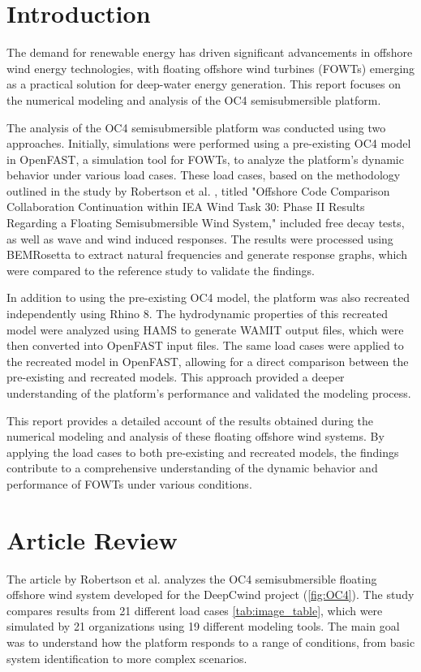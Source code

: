 \documentclass[a4paper, 11pt]{article}
\begin{document}
\section{Introduction}

\hspace*{0.5cm}The demand for renewable energy has driven significant advancements in offshore wind energy technologies, with floating offshore wind turbines (FOWTs) emerging as a practical solution for deep-water energy generation. This report focuses on the numerical modeling and analysis of the OC4 semisubmersible platform. 

The analysis of the OC4 semisubmersible platform was conducted using two approaches. Initially, simulations were performed using a pre-existing OC4 model in OpenFAST, a simulation tool for FOWTs, to analyze the platform's dynamic behavior under various load cases. These load cases, based on the methodology outlined in the study by Robertson et al. \cite{Robertson2014}, titled "Offshore Code Comparison Collaboration Continuation within IEA Wind Task 30: Phase II Results Regarding a Floating Semisubmersible Wind System," included free decay tests, as well as wave and wind induced responses. The results were processed using BEMRosetta to extract natural frequencies and generate response graphs, which were compared to the reference study to validate the findings.

In addition to using the pre-existing OC4 model, the platform was also recreated independently using Rhino 8. The hydrodynamic properties of this recreated model were analyzed using HAMS to generate WAMIT output files, which were then converted into OpenFAST input files. The same load cases were applied to the recreated model in OpenFAST, allowing for a direct comparison between the pre-existing and recreated models. This approach provided a deeper understanding of the platform's performance and validated the modeling process.

This report provides a detailed account of the results obtained during the numerical modeling and analysis of these floating offshore wind systems. By applying the load cases to both pre-existing and recreated models, the findings contribute to a comprehensive understanding of the dynamic behavior and performance of FOWTs under various conditions.

\section{Article Review}
\hspace*{0.5cm}The article by Robertson et al. \cite{Robertson2014} analyzes the OC4 semisubmersible floating offshore wind system developed for the DeepCwind project (\autoref{fig:OC4}). The study compares results from 21 different load cases \ref{tab:image_table}, which were simulated by 21 organizations using 19 different modeling tools. The main goal was to understand how the platform responds to a range of conditions, from basic system identification to more complex scenarios.
\end{document}
